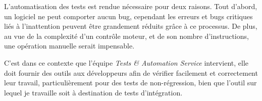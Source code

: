 L'automatisation des tests est rendue nécessaire pour deux raisons. Tout d'abord, un logiciel ne peut comporter aucun bug, cependant les erreurs et bugs critiques liés à l'inattention peuvent être grandement réduits grâce à ce processus. De plus, au vue de la complexité d'un contrôle moteur, et de son nombre d'instructions, une opération manuelle serait impensable. 

C'est dans ce contexte que l'équipe \textit{Tests \& Automation Service} intervient, elle doit fournir des outils aux développeurs afin de vérifier facilement et correctement leur travail, particulièrement pour des tests de non-régression, bien que l'outil sur lequel je travaille soit à destination de tests d'intégration.
